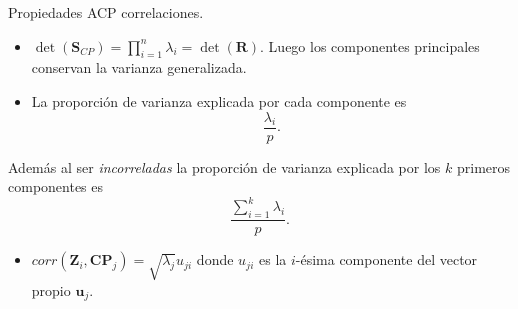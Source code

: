 \documentclass[
  spanish,
  ignorenonframetext,
]{beamer}
\providecommand{\tightlist}{%
  \setlength{\itemsep}{0pt}\setlength{\parskip}{0pt}}
\begin{document}
\begin{frame}{Propiedades ACP correlaciones.}
\protect\hypertarget{propiedades-acp-correlaciones.-3}{}
\begin{itemize}
\tightlist
\item
  \(\det(\mathbf{S}_{CP})=\prod_{i=1}^n \lambda_i =\det(\mathbf{R})\).
  Luego los componentes principales conservan la varianza generalizada.
\item
  La proporción de varianza explicada por cada componente es
  \[\frac{\lambda_i}{p}.\]
\end{itemize}

Además al ser \emph{incorreladas} la proporción de varianza explicada
por los \(k\) primeros componentes es
\[\frac{\sum_{i=1}^k \lambda_i}{p}.\]

\begin{itemize}
\tightlist
\item
  \(corr(\mathbf{Z}_i, \mathbf{CP}_j)=\sqrt{\lambda_j} u_{j i}\) donde
  \(u_{j i}\) es la \(i\)-ésima componente del vector propio
  \(\mathbf{u}_j\).
\end{itemize}
\end{frame}
\end{document}
